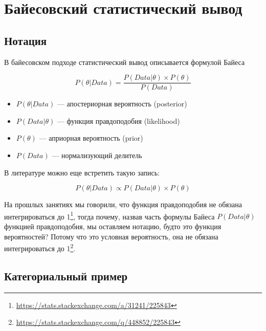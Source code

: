 \documentclass[
]{book}
\providecommand{\tightlist}{%
  \setlength{\itemsep}{0pt}\setlength{\parskip}{0pt}}
\renewcommand{\href}[2]{#2\footnote{\url{#1}}}
\begin{document}
\hypertarget{ux431ux430ux439ux435ux441ux43eux432ux441ux43aux438ux439-ux441ux442ux430ux442ux438ux441ux442ux438ux447ux435ux441ux43aux438ux439-ux432ux44bux432ux43eux434}{%
\chapter{Байесовский статистический вывод}\label{ux431ux430ux439ux435ux441ux43eux432ux441ux43aux438ux439-ux441ux442ux430ux442ux438ux441ux442ux438ux447ux435ux441ux43aux438ux439-ux432ux44bux432ux43eux434}}

\hypertarget{ux43dux43eux442ux430ux446ux438ux44f}{%
\section{Нотация}\label{ux43dux43eux442ux430ux446ux438ux44f}}

В байесовском подходе статистический вывод описывается формулой Байеса

\[P(θ|Data) = \frac{P(Data|θ)\times P(θ)}{P(Data)}\]

\begin{itemize}
\tightlist
\item
  \(P(θ|Data)\) --- апостериорная вероятность (posterior)
\item
  \(P(Data|θ)\) --- функция правдоподобия (likelihood)
\item
  \(P(θ)\) --- априорная вероятность (prior)
\item
  \(P(Data)\) --- нормализующий делитель
\end{itemize}

В литературе можно еще встретить такую запись:

\[P(θ|Data) \propto P(Data|θ)\times P(θ)\]

На прошлых занятиях мы говорили, что \href{https://stats.stackexchange.com/a/31241/225843}{функция правдоподобия не обязана интегрироваться до 1}, тогда почему, назвав часть формулы Байеса \(P(Data|θ)\) функцией правдоподобия, мы оставляем нотацию, будто это функция вероятностей? Потому что это условная вероятность, \href{https://stats.stackexchange.com/q/448852/225843}{она не обязана интегрироваться до 1}.

\hypertarget{ux43aux430ux442ux435ux433ux43eux440ux438ux430ux43bux44cux43dux44bux439-ux43fux440ux438ux43cux435ux440}{%
\section{Категориальный пример}\label{ux43aux430ux442ux435ux433ux43eux440ux438ux430ux43bux44cux43dux44bux439-ux43fux440ux438ux43cux435ux440}}
\end{document}
